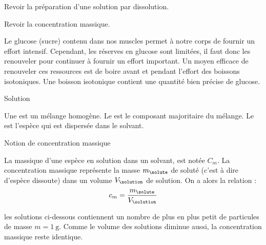 \tetePremStssChim
{}

\begin{objectifs}
  \item Revoir la préparation d'une solution par dissolution.
  \item Revoir la concentration massique.
\end{objectifs}

\begin{contexte}
  Le glucose (sucre) contenu dans nos muscles permet à notre corps de fournir un effort intensif.
  Cependant, les réserves en glucose sont limitées, il faut donc les renouveler pour continuer à fournir un effort important.
  Un moyen efficace de renouveler ces ressources est de boire avant et pendant l'effort des boissons isotoniques.
  Une boisson isotonique contient une quantité bien précise de glucose.
  
\end{contexte}
\bigskip


\begin{doc}{Solution}
  \begin{importants}
     Une  est un mélange homogène.
     Le  est le composant majoritaire du mélange. Le  est l'espèce qui est dispersée dans le solvant.
  \end{importants}
\end{doc}

\begin{doc}{Notion de concentration massique}
  \begin{importants}
    La  massique d’une espèce en solution dans un solvant, est notée $C_m$.
    La concentration massique représente la masse $m_\solute$ de soluté (c'est à dire d'espèce dissoute) dans un volume $V_\solution$ de solution.
    On a alors la relation :
    \begin{equation*}
      c_m = \dfrac{ m_\solute }{ V_\solution }
    \end{equation*}
  \end{importants}

  \exemple* les solutions ci-dessous contiennent un nombre de plus en plus petit de particules de masse $m = \qty{1}{\g}$.
  Comme le volume des solutions diminue aussi, la concentration massique reste identique.

\end{doc}

